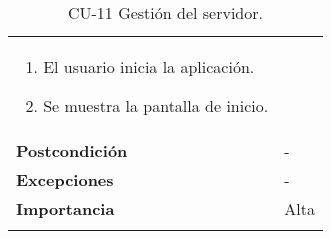 \begin{longtable}[h!]{@{}ll@{}}
\begin{minipage}[t]{0.71\columnwidth}
\begin{enumerate}
\def\labelenumi{\arabic{enumi}.}
\tightlist
\item
  El usuario inicia la aplicación.
\item
  Se muestra la pantalla de inicio.
\end{enumerate}\strut
\end{minipage}\tabularnewline
\begin{minipage}[t]{0.23\columnwidth}\raggedright\strut
\textbf{Postcondición}\strut
\end{minipage} & \begin{minipage}[t]{0.71\columnwidth}\raggedright\strut
-\strut
\end{minipage}\tabularnewline
\begin{minipage}[t]{0.23\columnwidth}\raggedright\strut
\textbf{Excepciones}\strut
\end{minipage} & \begin{minipage}[t]{0.71\columnwidth}\raggedright\strut
-\strut
\end{minipage}\tabularnewline
\begin{minipage}[t]{0.23\columnwidth}\raggedright\strut
\textbf{Importancia}\strut
\end{minipage} & \begin{minipage}[t]{0.71\columnwidth}\raggedright\strut
Alta\strut
\end{minipage}\tabularnewline
\bottomrule
\caption{CU-11 Gestión del servidor.}
\end{longtable}


